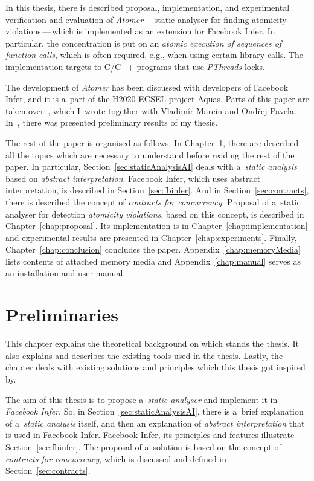 In this thesis, there is described proposal, implementation, and experimental
verification and evaluation of \emph{Atomer}\,---\,static analyser for
finding atomicity violations\,---\,which is implemented as an extension for
Facebook Infer. In particular, the concentration is put on an 
\emph{atomic execution of sequences of function calls}, which is often 
required, e.g., when using certain library calls. The implementation targets 
to C/C++ programs that use \emph{PThreads} locks.

The development of \emph{Atomer} has been discussed with developers of
Facebook Infer, and it is a~part of the H2020 ECSEL project Aquas. Parts
of this paper are taken over~\cite{excel2019FBInfer}, which I~wrote
together with Vladimír Marcin and Ondřej Pavela. In~\cite{excel2019FBInfer},
there was presented preliminary results of my thesis.

The rest of the paper is organised as follows. In 
Chapter~\ref{chap:preliminaries}, there are described all the topics
which are necessary to understand before reading the rest of the paper. In
particular, Section~\ref{sec:staticAnalysisAI} deals with
a~\emph{static analysis} based on \emph{abstract interpretation}.
Facebook Infer, which uses abstract interpretation, is described in
Section~\ref{sec:fbinfer}. And in Section~\ref{sec:contracts}, there is
described the concept of \emph{contracts for concurrency}. Proposal of a~static
analyser for detection \emph{atomicity violations}, based on this concept, is
described in Chapter~\ref{chap:proposal}. Its implementation is in
Chapter~\ref{chap:implementation} and experimental results are presented
in Chapter~\ref{chap:experiments}. Finally, Chapter~\ref{chap:conclusion}
concludes the paper. Appendix~\ref{chap:memoryMedia} lists contents
of attached memory media and Appendix~\ref{chap:manual} serves as an
installation and user manual.



\chapter{Preliminaries}
\label{chap:preliminaries}

This chapter explains the theoretical background on which stands the
thesis. It also explains and describes the existing tools used in the
thesis. Lastly, the chapter deals with existing solutions and principles
which this thesis got inspired by.

The aim of this thesis is to propose a~\emph{static analyser} and implement
it in \emph{Facebook Infer}. So, in Section~\ref{sec:staticAnalysisAI},
there is a~brief explanation of a~\emph{static analysis} itself, and then an 
explanation of \emph{abstract interpretation} that is used in Facebook Infer.
Facebook Infer, its principles and features illustrate 
Section~\ref{sec:fbinfer}. The proposal of a~solution is based on the 
concept of \emph{contracts for concurrency}, which is discussed and defined 
in Section~\ref{sec:contracts}.


